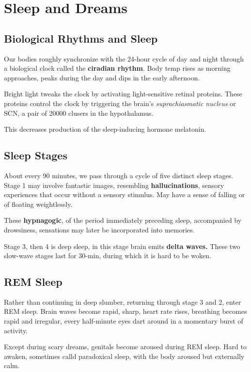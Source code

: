 \documentclass[12pt]{article}
\begin{document}
\section*{Sleep and Dreams}
\subsection*{Biological Rhythms and Sleep}
Our bodies roughly synchronize with the 24-hour cycle of day and night through a biological clock called the \textbf{ciradian rhythm}. Body temp rises as morning approaches, peaks during the day and dips in the early afternoon. 

Bright light tweaks the clock by activating light-sensitive retinal proteins. These proteins control the clock by triggering the brain's \textit{suprachiasmatic nucleus} or SCN, a pair of 20000 clusers in the hypothalamus.

This decreases production of the sleep-inducing hormone melatonin.

\subsection{Sleep Stages}
About every 90 minutes, we pass through a cycle of five distinct sleep stages. Stage 1 may involve fantastic images, resembling \textbf{hallucinations}, sensory experiences that occur without a sensory stimulus. May have a sense of falling or of floating weightlessly.

These \textbf{hypnagogic}, of the period immediately preceding sleep, accompanied by drowsiness, sensations may later be incorporated into memories. 

Stage 3, then 4 is deep sleep, in this stage brain emits \textbf{delta waves. } These two slow-wave stages last for 30-min, during which it is hard to be woken. 

\subsection*{REM Sleep}
Rather than continuing in deep slumber, returning through stage 3 and 2, enter REM sleep. Brain waves become rapid, sharp, heart rate rises, breathing becomes rapid and irregular, every half-minute eyes dart around in a momentary burst of activity. 

Except during scary dreams, genitals become aroused during REM sleep. Hard to awaken, sometimes calld paradoxical sleep, with the body aroused but externally calm.
\end{document}
